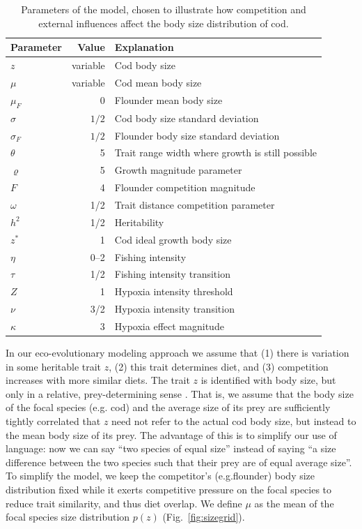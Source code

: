 \documentclass[9pt,twocolumn,twoside]{pnas-new}
\begin{document}
\begin{table}[t!]
\centering
\caption{Parameters of the model, chosen to illustrate how competition and external influences affect the body size distribution of cod.}
\label{tab:param}
\begin{tabular}{lrl}
Parameter & Value & Explanation \\
\midrule
$z$ & variable & Cod body size\\ 
             $\mu$ & variable & Cod mean body size\\ 
             $\mu_{F}$ & 0 & Flounder mean body size\\ 
             $\sigma$ & $1/2$ & Cod body size standard deviation \\ 
             $\sigma_{F}$ & $1/2$ & Flounder body size standard deviation \\ 
             $\theta$ & 5 & Trait range width where growth is still possible  \\
             $\varrho$ & 5 & Growth magnitude parameter \\
             $F$ & 4 & Flounder competition magnitude \\
             $\omega$ & 1/2 & Trait distance competition parameter \\ 
             $h^{2}$ & 1/2 & Heritability \\
             $z^{*}$ & 1 & Cod ideal growth body size \\
             $\eta$ & 0--2 & Fishing intensity \\
             $\tau$ & 1/2 & Fishing intensity transition \\
             $Z$ & 1 & Hypoxia intensity threshold \\
             $\nu$ & 3/2 & Hypoxia intensity transition \\
             $\kappa$ & 3 & Hypoxia effect magnitude \\
\bottomrule
\end{tabular}
\end{table}
 In our eco-evolutionary modeling approach we assume that (1) there is variation in some heritable trait $z$, (2) this trait determines diet, and (3) competition increases with more similar diets. The trait $z$ is identified with body size, but only in a relative, prey-determining sense \citep{Schneider2016}. That is, we assume that the body size of the focal species (e.g. cod) and the average size of its prey are sufficiently tightly correlated that $z$ need not refer to the actual cod body size, but instead to the mean body size of its prey. The advantage of this is to simplify our use of language: now we can say ``two species of equal size'' instead of saying ``a size difference between the two species such that their prey are of equal average size''. To simplify the model, we keep the competitor's (e.g.flounder) body size distribution fixed while it exerts competitive pressure on the focal species to reduce trait similarity, and thus diet overlap. We define $\mu$ as the mean of the focal species size distribution $p(z)$ (Fig.~\ref{fig:sizegrid}). 
\end{document}
